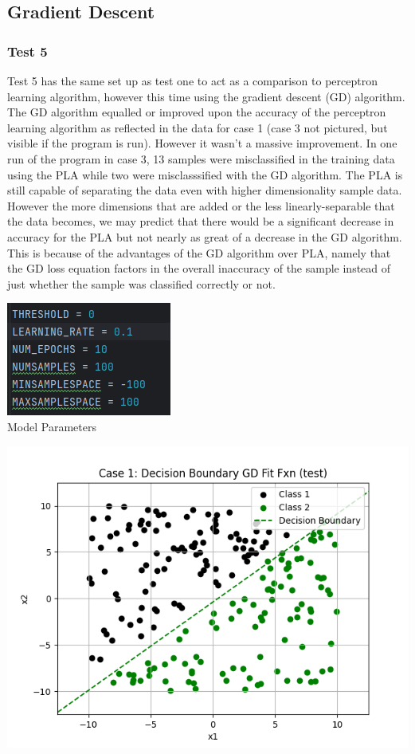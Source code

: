 \documentclass{article}
\begin{document}
\subsection{Gradient Descent}

\subsubsection{Test 5}

Test 5 has the same set up as test one to act as a comparison to perceptron learning algorithm, however this time using the gradient descent (GD) algorithm. The GD algorithm equalled or improved upon the accuracy of the perceptron learning algorithm as reflected in the data for case 1 (case 3 not pictured, but visible if the program is run). However it wasn't a massive improvement. In one run of the program in case 3, 13 samples were misclassified in the training data using the PLA while two were misclasssified with the GD algorithm. The PLA is still capable of separating the data even with higher dimensionality sample data. However the more dimensions that are added or the less linearly-separable that the data becomes, we may predict that there would be a significant decrease in accuracy for the PLA but not nearly as great of a decrease in the GD algorithm. This is because of the advantages of the GD algorithm over PLA, namely that the GD loss equation factors in the overall inaccuracy of the sample instead of just whether the sample was classified correctly or not.
\begin{center}
\includegraphics[scale=0.75]{../figs/T1.1.png} \\
\caption{Model Parameters}
\end{center}

\begin{center}
\includegraphics[scale=0.75]{../figs/T5.2.png} \\
\end{center}
\end{document}
